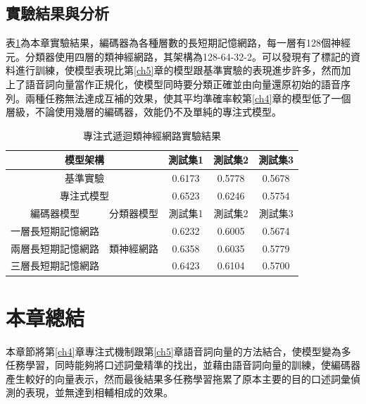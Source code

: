 \subsection{實驗結果與分析}
表\ref{table:ch6_exp}為本章實驗結果，編碼器為各種層數的長短期記憶網路，每一層有128個神經元。分類器使用四層的類神經網路，其架構為128-64-32-2。可以發現有了標記的資料進行訓練，使模型表現比第\ref{ch5}章的模型跟基準實驗的表現進步許多，然而加上了語音詞向量當作正規化，使模型同時要分類正確並由向量還原初始的語音序列。兩種任務無法達成互補的效果，使其平均準確率較第\ref{ch4}章的模型低了一個層級，不論使用幾層的編碼器，效能仍不及單純的專注式模型。
\begin{table}[ht]
	 \centering
	 \caption{專注式遞迴類神經網路實驗結果}
	 \label{table:ch6_exp}
	 \begin{tabular}{|c|c|c|c|c|}
		 \hline
		 \multicolumn{2}{|c|}{模型架構} & 測試集1 & 測試集2 & 測試集3 \\
		 \hline
		 \multicolumn{2}{|c|}{基準實驗} & 0.6173 & 0.5778 & 0.5678\\
		 \hline
		 \multicolumn{2}{|c|}{專注式模型} & 0.6523 & 0.6246 & 0.5754\\
		 \hline 
		 編碼器模型 & 分類器模型 & 測試集1 &測試集2 & 測試集3 \\
		 \hline
		 一層長短期記憶網路&\multirow{3}{*}{類神經網路} &
		   0.6232 &0.6005 & 0.5674\\
		 \cline{1-1}\cline{3-5}
		 兩層長短期記憶網路& & 0.6358 & 0.6035 & 0.5779 \\
		 \cline{1-1}\cline{3-5}
		 三層長短期記憶網路& & 0.6423 & 0.6104 & 0.5700 \\ 
		 \hline
	   \end{tabular}
\end{table}
\section{本章總結}
本章節將第\ref{ch4}章專注式機制跟第\ref{ch5}章語音詞向量的方法結合，使模型變為多任務學習，同時能夠將口述詞彙精準的找出，並藉由語音詞向量的訓練，使編碼器產生較好的向量表示，然而最後結果多任務學習拖累了原本主要的目的口述詞彙偵測的表現，並無達到相輔相成的效果。
